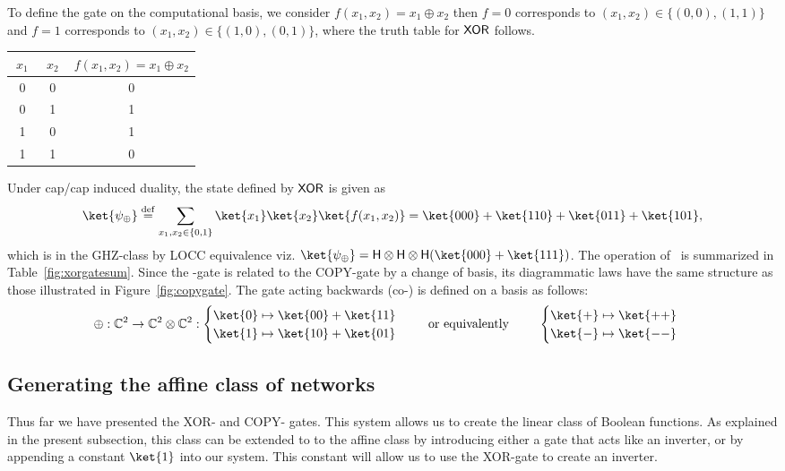 To define the gate on the computational basis, we
consider $f(x_1,x_2)=x_1\oplus x_2$ then $f=0$ corresponds to
$(x_1,x_2)\in\{(0,0),(1,1)\}$ and $f=1$ corresponds to $(x_1,x_2)\in\{(1,0),(0,1)\}$,
where the
truth table for $\text{\sf XOR}$ follows. 
\begin{center}
\begin{tabular}{c|c|c}
$~x_1~$ & $~x_2~$ & $f(x_1,x_2)=x_1\oplus x_2$ \\ \hline
0 & 0 & 0 \\
0 & 1 & 1 \\
1 & 0 & 1 \\
1 & 1 & 0
\end{tabular}
\end{center}
Under cap/cap induced duality, the state defined by $\text{\sf XOR}$ is given as
\begin{equation}
\ket{\psi_\oplus}\bydef\sum_{x_1,x_2\in\{0,1\}}\ket{x_1}\ket{x_2}\ket{f(x_1,x_2)}
=\ket { 000 }
+\ket { 110 }
+\ket{011}+\ket{101}, 
\end{equation}
which is in the {\sf GHZ}-class by LOCC equivalence viz.
$\ket{\psi_\oplus}=\H\otimes\H\otimes\H(\ket{000}+\ket{111})$.  The operation of
\XOR~is
summarized in Table~\ref{fig:xorgatesum}.  Since the
\XOR-gate is related to the {\sf COPY}-gate by a change of basis, its diagrammatic
laws
have the same structure as those illustrated in Figure~\ref{fig:copygate}.  The gate
acting backwards (co-\XOR) is
defined on a basis as follows:
$$
\oplus:\7C^2\rightarrow\7C^2\otimes\7C^2:
\begin{cases}
\ket{0} \mapsto \ket{00}+\ket{11}\\
\ket{1} \mapsto \ket{10}+\ket{01}
\end{cases}~~~~\text{or equivalently}~~~~~~~\begin{cases}
\ket{+} \mapsto \ket{++}\\
\ket{-} \mapsto \ket{--}
\end{cases}
$$



\subsection*{Generating the affine class of networks}
Thus far we have presented the {\sf XOR}- and {\sf COPY}- gates.  This system allows
us to create the linear class of Boolean functions.  As explained in the present
subsection, this class can be extended to to the affine class by introducing either a
gate that acts like an inverter, or by appending a constant $\ket{1}$ into our
system.  This constant will allow us to use the {\sf XOR}-gate to create an
inverter.   

